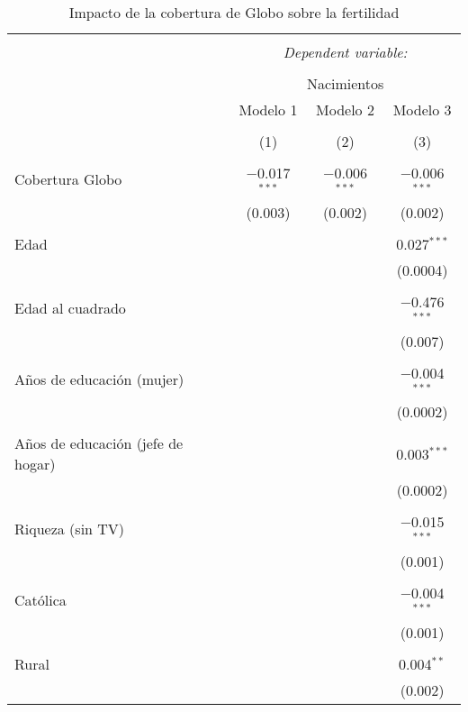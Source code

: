 
\begin{table}[!htbp] \centering 
  \caption{Impacto de la cobertura de Globo sobre la fertilidad} 
  \label{tab:globo_fertilidad} 
\begin{tabular}{@{\extracolsep{5pt}}lccc} 
\\[-1.8ex]\hline 
\hline \\[-1.8ex] 
 & \multicolumn{3}{c}{\textit{Dependent variable:}} \\ 
\cline{2-4} 
\\[-1.8ex] & \multicolumn{3}{c}{Nacimientos} \\ 
 & Modelo 1 & Modelo 2 & Modelo 3 \\ 
\\[-1.8ex] & (1) & (2) & (3)\\ 
\hline \\[-1.8ex] 
 Cobertura Globo & $-$0.017$^{***}$ & $-$0.006$^{***}$ & $-$0.006$^{***}$ \\ 
  & (0.003) & (0.002) & (0.002) \\ 
  & & & \\ 
 Edad &  &  & 0.027$^{***}$ \\ 
  &  &  & (0.0004) \\ 
  & & & \\ 
 Edad al cuadrado &  &  & $-$0.476$^{***}$ \\ 
  &  &  & (0.007) \\ 
  & & & \\ 
 Años de educación (mujer) &  &  & $-$0.004$^{***}$ \\ 
  &  &  & (0.0002) \\ 
  & & & \\ 
 Años de educación (jefe de hogar) &  &  & 0.003$^{***}$ \\ 
  &  &  & (0.0002) \\ 
  & & & \\ 
 Riqueza (sin TV) &  &  & $-$0.015$^{***}$ \\ 
  &  &  & (0.001) \\ 
  & & & \\ 
 Católica &  &  & $-$0.004$^{***}$ \\ 
  &  &  & (0.001) \\ 
  & & & \\ 
 Rural &  &  & 0.004$^{**}$ \\ 
  &  &  & (0.002) \\ 

\end{tabular}
\end{table}

